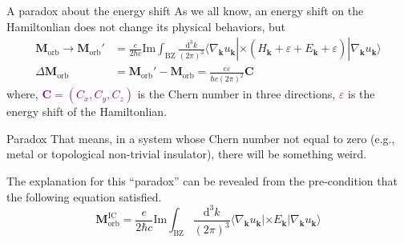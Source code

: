 \documentclass{beamer}
\newcommand{\purple}{\textcolor{purple}}
\begin{document}
    \begin{frame}{A paradox about the energy shift}\small
      As we all know, an energy shift on the Hamiltonlian does not change its physical behaviors, but
      \begin{equation}
        \begin{aligned}
          \bm{M}_{\text{orb}}\to\bm{M}_{\text{orb}}' &= \frac{e}{2\hbar{}c}\text{Im}\int_{\text{BZ}}\frac{\mathrm{d}^3k}{(2\pi)^3}\langle\nabla_{\bm{k}}u_{\bm{k}}|\times(\widehat{H}_{\bm{k}}+\varepsilon+E_{\bm{k}}+\varepsilon)|\nabla_{\bm{k}}u_{\bm{k}}\rangle\\
          \Delta\bm{M}_{\text{orb}} &= \bm{M}_{\text{orb}}'-\bm{M}_{\text{orb}} = \frac{e\varepsilon}{\hbar{}c(2\pi)^2}\bm{C}
        \end{aligned}
      \end{equation}
      where, \purple{\(\bm{C} = (C_x, C_y, C_z)\)} is the Chern number in three directions, \purple{\(\varepsilon\)} is the energy shift of the Hamiltonlian.

      \begin{alertblock}{Paradox}
        That means, in a system whose Chern number not equal to zero (e.g., metal or topological non-trivial insulator), there will be something weird.
      \end{alertblock}

      \begin{block}{}
        The explanation for this ``paradox'' can be revealed from the pre-condition that the following equation satisfied.
        \begin{equation*}
          \bm{M}_{\text{orb}}^{\text{IC}} = \frac{e}{2\hbar{}c}\text{Im}\int_{\text{BZ}}\frac{\mathrm{d}^3k}{(2\pi)^3}\langle\nabla_{\bm{k}}u_{\bm{k}}|\times{}E_{\bm{k}}|\nabla_{\bm{k}}u_{\bm{k}}\rangle
        \end{equation*}
      \end{block}
    \end{frame}
\end{document}
